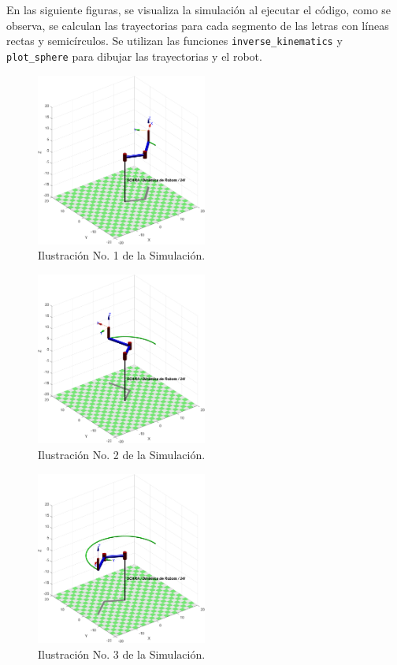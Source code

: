 \documentclass[final]{foresj}
\begin{document}
En las siguiente figuras, se visualiza la simulación al ejecutar el código, como se observa, se calculan las trayectorias para cada segmento de las letras con líneas rectas y semicírculos. Se utilizan las funciones \texttt{inverse\_kinematics} y \texttt{plot\_sphere} para dibujar las trayectorias y el robot.

\begin{figure}[h!]
\centering
\includegraphics[width=0.5\textwidth]{G0.png}
\caption{Ilustración No. 1 de la Simulación.}
\label{fig:my_label}
\end{figure}

\begin{figure}[h!]
\centering
\includegraphics[width=0.5\textwidth]{G1.png}
\caption{Ilustración No. 2 de la Simulación.}
\label{fig:my_label}
\end{figure}

\begin{figure}[h!]
\centering
\includegraphics[width=0.5\textwidth]{G2.png}
\caption{Ilustración No. 3 de la Simulación.}
\label{fig:my_label}
\end{figure}
\end{document}
